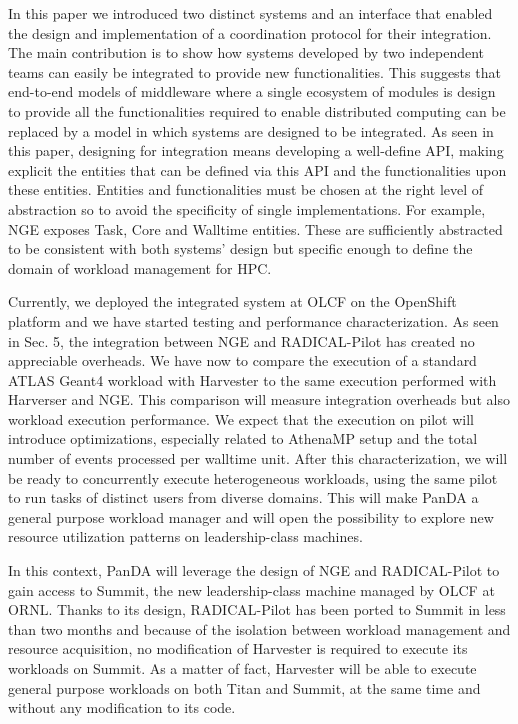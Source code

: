 \documentclass{webofc}
\begin{document}
In this paper we introduced two distinct systems and an interface that enabled the design and implementation of a coordination protocol for their integration. The main contribution is to show how systems developed by two independent teams can easily be integrated to provide new functionalities. This suggests that end-to-end models of middleware where a single ecosystem of modules is design to provide all the functionalities required to enable distributed computing can be replaced by a model in which systems are designed to be integrated. As seen in this paper, designing for integration means developing a well-define API, making explicit the entities that can be defined via this API and the functionalities upon these entities. Entities and functionalities must be chosen at the right level of abstraction so to avoid the specificity of single implementations. For example, NGE exposes Task, Core and Walltime entities. These are sufficiently abstracted to be consistent with both systems’ design but specific enough to define the domain of workload management for HPC.

Currently, we deployed the integrated system at OLCF on the OpenShift platform and we have started testing and performance characterization. As seen in Sec. 5, the integration between NGE and RADICAL-Pilot has created no appreciable overheads. We have now to compare the execution of a standard ATLAS Geant4 workload with Harvester to the same execution performed with Harverser and NGE. This comparison will measure integration overheads but also workload execution performance. We expect that the execution on pilot will introduce optimizations, especially related to AthenaMP setup and the total number of events processed per walltime unit. After this characterization, we will be ready to concurrently execute heterogeneous workloads, using the same pilot to run tasks of distinct users from diverse domains. This will make PanDA a general purpose workload manager and will open the possibility to explore new resource utilization patterns on leadership-class machines. 

In this context, PanDA will leverage the design of NGE and RADICAL-Pilot to gain access to Summit, the new leadership-class machine managed by OLCF at ORNL. Thanks to its design, RADICAL-Pilot has been ported to Summit in less than two months and because of the isolation between workload management and resource acquisition, no modification of Harvester is required to execute its workloads on Summit. As a matter of fact, Harvester will be able to execute general purpose workloads on both Titan and Summit, at the same time and without any modification to its code.
\end{document}
